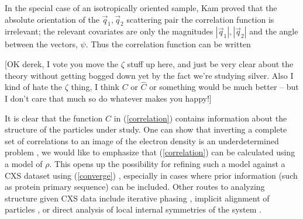 \documentclass [11pt,fleqn]{article}
\begin{document}
In the special case of an isotropically oriented sample, Kam proved that the absolute orientation of the $\vec{q}_1, \vec{q}_2$ scattering pair the correlation function is irrelevant; the relevant covariates are only the magnitudes $| \vec{q}_1 | , | \vec{q}_2 | $ and the angle between the vectors, $\psi$. Thus the correlation function can be written

[OK derek, I vote you move the $\zeta$ stuff up here, and just be very clear about the theory without getting bogged down yet by the fact we're studying silver. Also I kind of hate the $\zeta$ thing, I think $C$ or $\hat{C}$ or something would be much better -- but I don't care that much so do whatever makes you happy!]

It is clear that the function $C$ in (\ref{correlation}) contains information about the structure of the particles under study. One can show that inverting a complete set of correlations to an image of the electron density is an underdetermined problem \cite{Elser:2011ez}, we would like to emphasize that (\ref{correlation}) can be calculated using a model of $\rho$. This opens up the possibility for refining such a model against a CXS dataset using (\ref{converge}) \cite{Liu:2013dv, Chen:2013io, Saldin:2009jj}, especially in cases where prior information (such as protein primary sequence) can be included. Other routes to analyzing structure given CXS data include iterative phasing \cite{Saldin:2010bx}, implicit alignment of particles \cite{Poon:2013ia}, or direct analysis of local internal symmetries of the system \cite{Kurta:2012cb, Kurta:2013to}.
\end{document}
